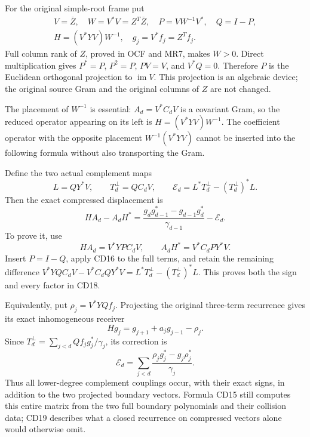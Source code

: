 \documentclass[11pt]{article}
\begin{document}
For the original simple-root frame put
\[
\begin{gathered}
 V=\overline Z,\quad W=V^*V=Z^T\overline Z,\quad P=VW^{-1}V^*,\quad Q=I-P,\\
 H=(V^*YV)W^{-1},\quad g_j=V^*f_j=Z^Tf_j.
\end{gathered}
\]
Full column rank of \(Z\), proved in OCF and MR7, makes \(W>0\).
Direct multiplication gives \(P^*=P\), \(P^2=P\),
\(PV=V\), and \(V^*Q=0\). Therefore \(P\) is the Euclidean
orthogonal projection to \(\operatorname{im}V\). This projection is
an algebraic device; the original source Gram and the original columns
of \(Z\) are not changed.

The placement of \(W^{-1}\) is essential: \(A_d=V^*C_dV\) is a
covariant Gram, so the reduced operator appearing on its left is
\(H=(V^*YV)W^{-1}\). The coefficient operator with the opposite
placement \(W^{-1}(V^*YV)\) cannot be inserted into the following
formula without also transporting the Gram.

Define the two actual complement maps
\[
 L=QY^*V,\qquad T_d^{\perp}=QC_dV,\qquad
 \mathcal E_d=L^*T_d^{\perp}-(T_d^{\perp})^*L.
\]
Then the exact compressed displacement is
\begin{equation}\label{cdroot:eq:compressed-displacement}
 \boxed{HA_d-A_dH^*=
 \frac{g_dg_{d-1}^*-g_{d-1}g_d^*}{\gamma_{d-1}}
   -\mathcal E_d.}
 \tag{CD18}
\end{equation}
To prove it, use
\[
 HA_d=V^*YPC_dV,\qquad A_dH^*=V^*C_dPY^*V.
\]
Insert \(P=I-Q\), apply CD16 to the full terms, and retain the
remaining difference
\(V^*YQC_dV-V^*C_dQY^*V=L^*T_d^\perp-(T_d^\perp)^*L\).
This proves both the sign and every factor in CD18.

Equivalently, put \(\rho_j=V^*YQf_j\). Projecting the original
three-term recurrence gives its exact inhomogeneous receiver
\[
 Hg_j=g_{j+1}+a_jg_{j-1}-\rho_j.
\]
Since \(T_d^\perp=\sum_{j<d}Qf_jg_j^*/\gamma_j\), its correction is
\begin{equation}\label{cdroot:eq:correction-sum}
 \mathcal E_d=\sum_{j<d}
    \frac{\rho_jg_j^*-g_j\rho_j^*}{\gamma_j}.
 \tag{CD19}
\end{equation}
Thus all lower-degree complement couplings occur, with their exact
signs, in addition to the two projected boundary vectors. Formula CD15
still computes this entire matrix from the two full boundary
polynomials and their collision data; CD19 describes what a closed
recurrence on compressed vectors alone would otherwise omit.
\end{document}
